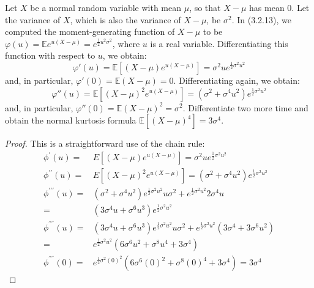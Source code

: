 \documentclass{article}
\newcommand{\E}{\mathbb{E}}
\theoremstyle{definition}
\theoremstyle{definition}
\begin{document}
\begin{enumerate}
    Let $X$ be a normal random variable with mean $\mu$, so that $X-\mu$ has mean $0$. Let the variance of $X$, which is also the variance of $X-\mu$, be $\sigma^2$. In (3.2.13), we computed the moment-generating function of $X-\mu$ to be $\varphi(u) = \E e^{u(X-\mu)}=e^{\frac{1}{2}u^2 \sigma^2}$, where $u$ is a real variable. Differentiating this function with respect to $u$, we obtain:
    $$ \varphi'(u) = \E\left[ (X-\mu) e^{u(X-\mu)}\right] = \sigma^2 ue^{\frac{1}{2}\sigma^2u^2}$$
    and, in particular, $\varphi'(0) = \E(X-\mu)=0$. Differentiating again, we obtain:
    $$ \varphi''(u) = \E\left[ (X-\mu)^2 e^{u(X-\mu)}\right] = (\sigma^2+\sigma^4u^2) e^{\frac{1}{2}\sigma^2u^2}$$
    and, in particular, $\varphi''(0) = \E(X-\mu)^2=\sigma^2$. Differentiate two more time and obtain the normal kurtosis formula $\E\left[ (X-\mu)^4\right]=3\sigma^4$.
    

    
    \begin{proof}
    This is a straightforward use of the chain rule:
    \begin{align*}
\phi ^{\prime }(u) =&E\left[ \left( X-\mu \right) e^{u(X-\mu )}\right] =\sigma ^{2}ue^{\frac{1}{2}\sigma ^{2}u^{2}} \\
\phi ^{\prime \prime }(u) =&E\left[ \left( X-\mu \right) ^{2}e^{u(X-\mu )}
\right] =\left( \sigma ^{2}+\sigma ^{4}u^{2}\right) e^{\frac{1}{2}\sigma^{2}u^{2}} \\
\phi ^{\prime \prime \prime }(u) =&\left( \sigma ^{2}+\sigma^{4}u^{2}\right) e^{\frac{1}{2}\sigma^{2}u^{2}}u\sigma ^{2}+e^{\frac{1}{2}
\sigma^{2}u^{2}}2\sigma ^{4}u \\
=&\left( 3\sigma ^{4}u+\sigma ^{6}u^{3}\right) e^{\frac{1}{2}\sigma^{2}u^{2}} \\
\phi^{^{\prime \prime \prime \prime }}(u) =&\left( 3\sigma ^{4}u+\sigma
^{6}u^{3}\right) e^{\frac{1}{2}\sigma ^{2}u^{2}}u\sigma ^{2}+e^{\frac{1}{2}%
\sigma^{2}u^{2}}\left( 3\sigma ^{4}+3\sigma ^{6}u^{2}\right)\\
=&e^{\frac{1}{2}\sigma ^{2}u^{2}}\left(6\sigma^{6}u^{2}+\sigma^{8}u^{4}+3\sigma ^{4}\right)  \\
\phi ^{^{\prime \prime \prime \prime }}(0)=&e^{\frac{1}{2}\sigma^{2}\left( 0\right) ^{2}}\left(6\sigma ^{6}\left( 0\right) ^{2}+\sigma^{8}\left(0\right) ^{4}+3\sigma ^{4}\right)=3\sigma ^{4}
\end{align*}
    
    \end{proof}
    

\end{enumerate}
\end{document}
